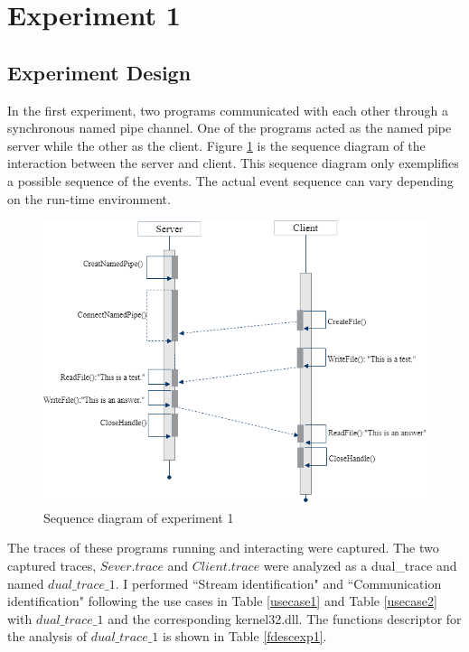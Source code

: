 \section{Experiment 1}
\subsection{Experiment Design}
In the first experiment, two programs communicated with each other through a synchronous named pipe channel. One of the programs acted as the named pipe server while the other as the client. Figure \ref{exp1} is the sequence diagram of the interaction between the server and client. This sequence diagram only exemplifies a possible sequence of the events. The actual event sequence can vary depending on the run-time environment. 


\begin{figure}[H]
\centerline{\includegraphics[scale=0.6]{Figures/exp1}}
 \caption{Sequence diagram of experiment 1}
\label{exp1}
\end{figure}

The traces of these programs running and interacting were captured. The two captured traces, $Sever.trace$ and $Client.trace$ were analyzed as a dual\_trace and named $dual\_trace\_1$. I performed ``Stream identification" and ``Communication identification" following the use cases in Table \ref{usecase1} and Table \ref{usecase2} with $dual\_trace\_1$ and the corresponding kernel32.dll. The functions descriptor for the analysis of $dual\_trace\_1$ is shown in Table \ref{fdescexp1}.

